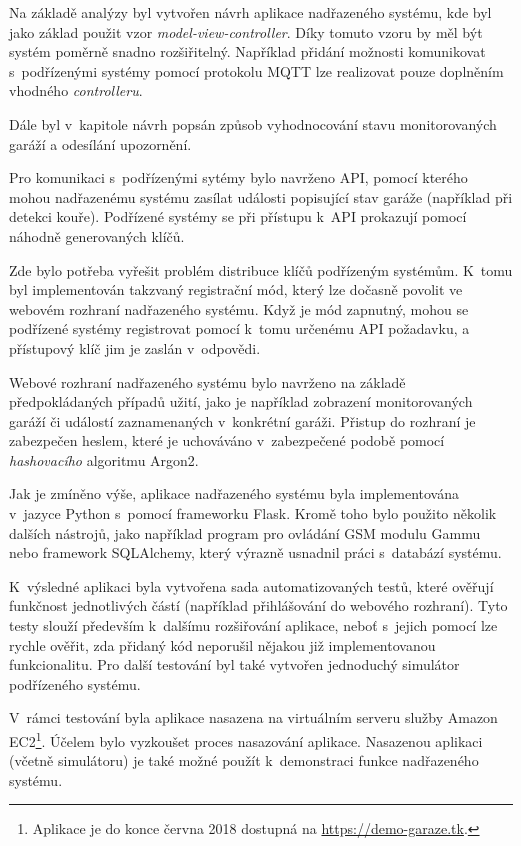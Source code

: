 Na základě analýzy byl vytvořen návrh aplikace nadřazeného systému, kde byl jako základ použit vzor \textit{model-view-controller}. Díky tomuto vzoru by měl být systém poměrně snadno rozšiřitelný. Například přidání možnosti komunikovat s~podřízenými systémy pomocí protokolu MQTT lze realizovat pouze doplněním vhodného \textit{controlleru}.

Dále byl v~kapitole návrh popsán způsob vyhodnocování stavu monitorovaných garáží a odesílání upozornění.

Pro komunikaci s~podřízenými sytémy bylo navrženo API, pomocí kterého mohou nadřazenému systému zasílat události popisující stav garáže (například při detekci kouře). Podřízené systémy se při přístupu k~API prokazují pomocí náhodně generovaných klíčů.

Zde bylo potřeba vyřešit problém distribuce klíčů podřízeným systémům. K~tomu byl implementován takzvaný registrační mód, který lze dočasně povolit ve webovém rozhraní nadřazeného systému. Když je mód zapnutný, mohou se podřízené systémy registrovat pomocí k~tomu určenému API požadavku, a přístupový klíč jim je zaslán v~odpovědi.

Webové rozhraní nadřazeného systému bylo navrženo na základě předpokládaných případů užití, jako je například zobrazení monitorovaných garáží či událostí zaznamenaných v~konkrétní garáži. Přistup do rozhraní je zabezpečen heslem, které je uchováváno v~zabezpečené podobě pomocí \textit{hashovacího} algoritmu Argon2.

Jak je zmíněno výše, aplikace nadřazeného systému byla implementována v~jazyce Python s~pomocí frameworku Flask. Kromě toho bylo použito několik dalších nástrojů, jako například program pro ovládání GSM modulu Gammu nebo framework SQLAlchemy, který výrazně usnadnil práci s~databází systému.


K~výsledné aplikaci byla vytvořena sada automatizovaných testů, které ověřují funkčnost jednotlivých částí (například přihlášování do webového rozhraní). Tyto testy slouží především k~dalšímu rozšiřování aplikace, neboť s~jejich pomocí lze rychle ověřit, zda přidaný kód neporušil nějakou již implementovanou funkcionalitu. Pro další testování byl také vytvořen jednoduchý simulátor podřízeného systému.

V~rámci testování byla aplikace nasazena na virtuálním serveru služby Amazon EC2\footnote{Aplikace je do konce června 2018 dostupná na \url{https://demo-garaze.tk}.}. Účelem bylo vyzkoušet proces nasazování aplikace. Nasazenou aplikaci (včetně simulátoru) je také možné použít k~demonstraci funkce nadřazeného systému.

